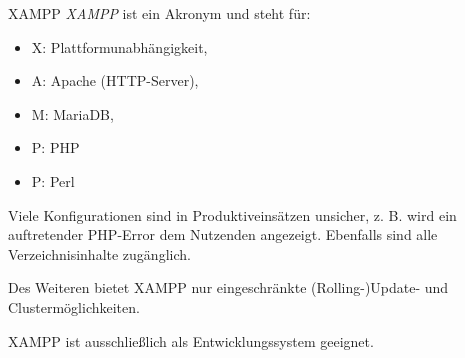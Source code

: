 \begin{bonus}{XAMPP}
    \emph{XAMPP} ist ein Akronym und steht für: 
    \begin{itemize}
        \item X: Plattformunabhängigkeit,
        \item A: Apache (HTTP-Server),
        \item M: MariaDB,
        \item P: PHP
        \item P: Perl
    \end{itemize}
    
    Viele Konfigurationen sind in Produktiveinsätzen unsicher, z. B. wird ein auftretender PHP-Error dem Nutzenden angezeigt.
    Ebenfalls sind alle Verzeichnisinhalte zugänglich.
    
    Des Weiteren bietet XAMPP nur eingeschränkte (Rolling-)Update- und Clustermöglichkeiten.
    
    XAMPP ist ausschließlich als Entwicklungssystem geeignet.
    
\end{bonus}